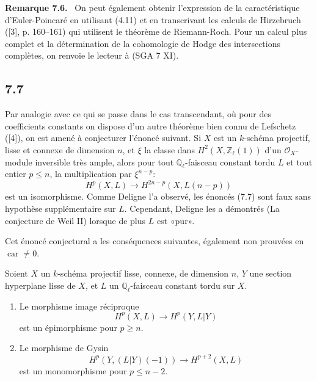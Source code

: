 \documentclass[11pt]{article}
\newenvironment{statement}[1]{\par\medskip\noindent\textbf{#1.}\ }{\par\medskip}
\begin{document}
\begin{statement}{Remarque 7.6}
On peut également obtenir l'expression de la caractéristique d'Euler-Poincaré en utilisant (4.11) et en transcrivant les calculs de Hirzebruch ([3], p. 160--161) qui utilisent le théorème de Riemann-Roch. Pour un calcul plus complet et la détermination de la cohomologie de Hodge des intersections complètes, on renvoie le lecteur à (SGA 7 XI).
\end{statement}

\subsection*{7.7}

Par analogie avec ce qui se passe dans le cas transcendant, où pour des coefficients constants on dispose d'un autre théorème bien connu de Lefschetz ([4]), on est amené à conjecturer l'énoncé suivant. Si $X$ est un $k$-schéma projectif, lisse et connexe de dimension $n$, et $\xi$ la classe dans $H^2(X,\mathbb Z_\ell(1))$ d'un $\mathcal O_X$-module inversible très ample, alors pour tout $\mathbb Q_\ell$-faisceau constant tordu $L$ et tout entier $p\le n$, la multiplication par $\xi^{n-p}$:
\[
H^p(X,L)\to H^{2n-p}(X,L(n-p))
\]
est un isomorphisme. Comme Deligne l'a observé, les énoncés (7.7) sont faux sans hypothèse supplémentaire sur $L$. Cependant, Deligne les a démontrés (La conjecture de Weil II) lorsque de plus $L$ est «pur».

Cet énoncé conjectural a les conséquences suivantes, également non prouvées en $\operatorname{car}\ne0$.

Soient $X$ un $k$-schéma projectif lisse, connexe, de dimension $n$, $Y$ une section hyperplane lisse de $X$, et $L$ un $\mathbb Q_\ell$-faisceau constant tordu sur $X$.
\begin{enumerate}[label=(\roman*)]
\item Le morphisme image réciproque
\[
H^p(X,L)\to H^p(Y,L|Y)
\]
est un épimorphisme pour $p\ge n$.
\item Le morphisme de Gysin
\[
H^p(Y,(L|Y)(-1))\to H^{p+2}(X,L)
\]
est un monomorphisme pour $p\le n-2$.
\end{enumerate}
\end{document}
